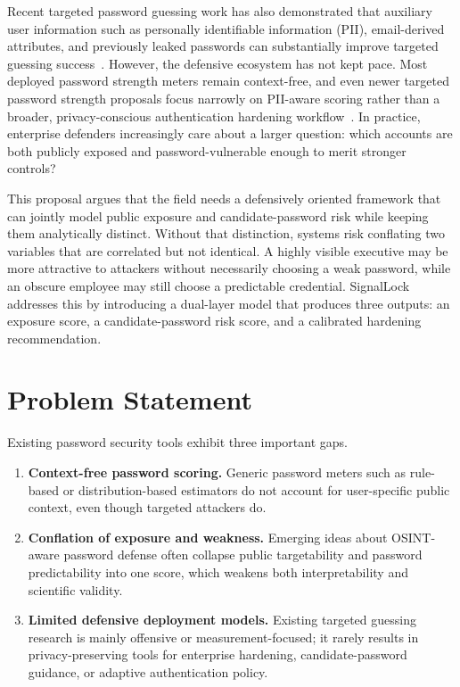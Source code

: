 \documentclass[11pt]{article}
\begin{document}
Recent targeted password guessing work has also demonstrated that auxiliary user information such as personally identifiable information (PII), email-derived attributes, and previously leaked passwords can substantially improve targeted guessing success~\cite{targuess2016,universalmachines2024,dtu2026email}. However, the defensive ecosystem has not kept pace. Most deployed password strength meters remain context-free, and even newer targeted password strength proposals focus narrowly on PII-aware scoring rather than a broader, privacy-conscious authentication hardening workflow~\cite{piipsm2023,wang2023psm}. In practice, enterprise defenders increasingly care about a larger question: which accounts are both publicly exposed and password-vulnerable enough to merit stronger controls?

This proposal argues that the field needs a defensively oriented framework that can jointly model public exposure and candidate-password risk while keeping them analytically distinct. Without that distinction, systems risk conflating two variables that are correlated but not identical. A highly visible executive may be more attractive to attackers without necessarily choosing a weak password, while an obscure employee may still choose a predictable credential. SignalLock addresses this by introducing a dual-layer model that produces three outputs: an exposure score, a candidate-password risk score, and a calibrated hardening recommendation.

\section{Problem Statement}
Existing password security tools exhibit three important gaps.

\begin{enumerate}[leftmargin=*]
  \item \textbf{Context-free password scoring.} Generic password meters such as rule-based or distribution-based estimators do not account for user-specific public context, even though targeted attackers do.
  \item \textbf{Conflation of exposure and weakness.} Emerging ideas about OSINT-aware password defense often collapse public targetability and password predictability into one score, which weakens both interpretability and scientific validity.
  \item \textbf{Limited defensive deployment models.} Existing targeted guessing research is mainly offensive or measurement-focused; it rarely results in privacy-preserving tools for enterprise hardening, candidate-password guidance, or adaptive authentication policy.
\end{enumerate}
\end{document}

